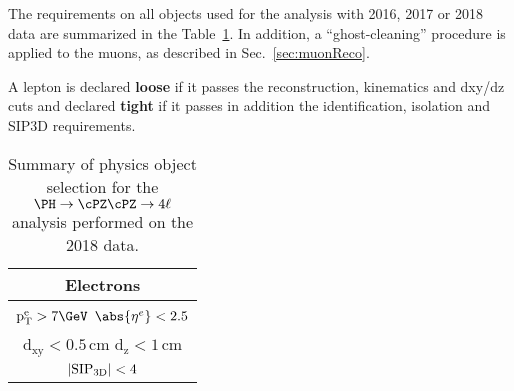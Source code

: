 The requirements on all objects used for the analysis with 2016, 2017 or 2018 data are summarized in the Table~\ref{tab:objsummary}. In addition, a ``ghost-cleaning'' procedure is applied to the muons, as described in Sec.~\ref{sec:muonReco}. 

A lepton is declared {\bf loose} if it passes the reconstruction, kinematics and dxy/dz cuts and declared {\bf tight} if it passes in addition the identification, isolation and SIP3D requirements. 

\renewcommand{\arraystretch}{2}
\begin{table}[H]
	\small
	\centering
	\caption{Summary of physics object selection for the $\HZZfl$ analysis performed on the 2018 data.}
	\label{tab:objsummary}
	\begin{tabular}{|c|c|}
		\hline \hline
		\multicolumn{2}{|c|}{\textbf{Electrons}}                                                                                                                                                                                    \\ \hline
		\multicolumn{2}{|c|}{$\mathrm{p_T^e} > 7 \GeV$ \hspace{0.5cm} $\abs{\eta^e} < 2.5$}                                                                                                                                               \\
		\multicolumn{2}{|c|}{$\mathrm{d_{xy}} < 0.5 \, \mathrm{cm}$ \hspace{0.5cm} $\mathrm{d_{z}} < 1 \, \mathrm{cm}$}                                                                                                                           \\
		\multicolumn{2}{|c|}{$| {\rm SIP_{3D}} | < 4$ }                                                                                                                                                                                   \\

\end{tabular}
\end{table}
